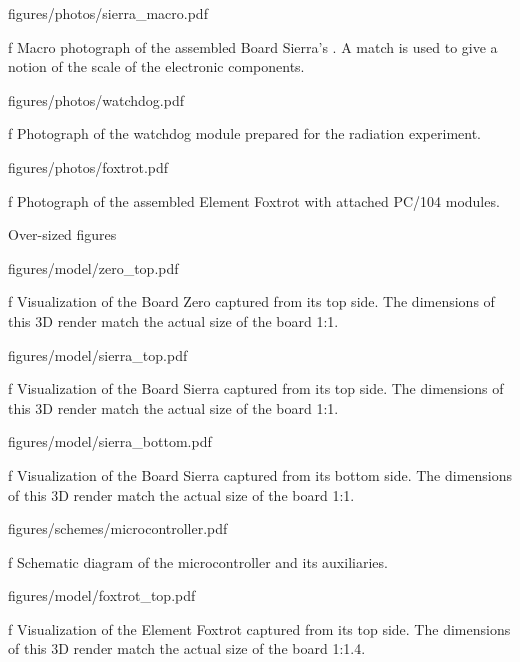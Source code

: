 \midinsert
    \hsize \cinspic figures/photos/sierra_macro.pdf
    \caption/f Macro photograph of the assembled Board Sierra's . A match is used to give a notion of the scale of the electronic components.
\endinsert

\midinsert
    \hsize \cinspic figures/photos/watchdog.pdf
    \caption/f Photograph of the watchdog module prepared for the radiation experiment.
\endinsert

\midinsert
    \picw=14.5cm \cinspic figures/photos/foxtrot.pdf
    \caption/f Photograph of the assembled Element Foxtrot with attached PC/104 modules.
\endinsert




\app Over-sized figures

\midinsert
    \picw=90.17mm \cinspic figures/model/zero_top.pdf
    \caption/f Visualization of the Board Zero captured from its top side. The dimensions of this 3D render match the actual size of the board 1:1.
\endinsert

\midinsert
    \picw=90.17mm \cinspic figures/model/sierra_top.pdf
    \caption/f Visualization of the Board Sierra captured from its top side. The dimensions of this 3D render match the actual size of the board 1:1.
\endinsert

\midinsert
    \picw=90.17mm \cinspic figures/model/sierra_bottom.pdf
    \caption/f Visualization of the Board Sierra captured from its bottom side. The dimensions of this 3D render match the actual size of the board 1:1.
\endinsert

\midinsert
    \hsize \cinspic figures/schemes/microcontroller.pdf
    \caption/f Schematic diagram of the microcontroller and its auxiliaries.
\endinsert

\midinsert
    \picw=14.5cm \cinspic figures/model/foxtrot_top.pdf
    \caption/f Visualization of the Element Foxtrot captured from its top side. The dimensions of this 3D render match the actual size of the board 1:1.4.
\endinsert

